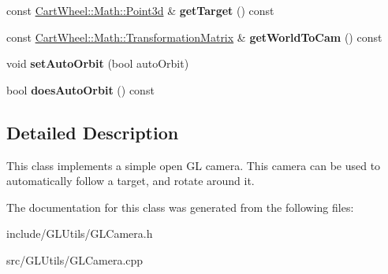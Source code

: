 \begin{DoxyCompactItemize}
\item 
\hypertarget{classCartWheel_1_1GL_1_1GLCamera_ad6055ff4f3873b8b727fd7d66ba289ca}{
const \hyperlink{classCartWheel_1_1Math_1_1Point3d}{CartWheel::Math::Point3d} \& {\bfseries getTarget} () const }
\label{classCartWheel_1_1GL_1_1GLCamera_ad6055ff4f3873b8b727fd7d66ba289ca}

\item 
\hypertarget{classCartWheel_1_1GL_1_1GLCamera_a949acd3b37f4a79b836513f648eafb37}{
const \hyperlink{classCartWheel_1_1Math_1_1TransformationMatrix}{CartWheel::Math::TransformationMatrix} \& {\bfseries getWorldToCam} () const }
\label{classCartWheel_1_1GL_1_1GLCamera_a949acd3b37f4a79b836513f648eafb37}

\item 
\hypertarget{classCartWheel_1_1GL_1_1GLCamera_abec31a659e3c9643678ff2c591a38a48}{
void {\bfseries setAutoOrbit} (bool autoOrbit)}
\label{classCartWheel_1_1GL_1_1GLCamera_abec31a659e3c9643678ff2c591a38a48}

\item 
\hypertarget{classCartWheel_1_1GL_1_1GLCamera_afe1a3286ffae6dce117e98500dc022c6}{
bool {\bfseries doesAutoOrbit} () const }
\label{classCartWheel_1_1GL_1_1GLCamera_afe1a3286ffae6dce117e98500dc022c6}

\end{DoxyCompactItemize}


\subsection{Detailed Description}
This class implements a simple open GL camera. This camera can be used to automatically follow a target, and rotate around it. 

The documentation for this class was generated from the following files:\begin{DoxyCompactItemize}
\item 
include/GLUtils/GLCamera.h\item 
src/GLUtils/GLCamera.cpp\end{DoxyCompactItemize}
